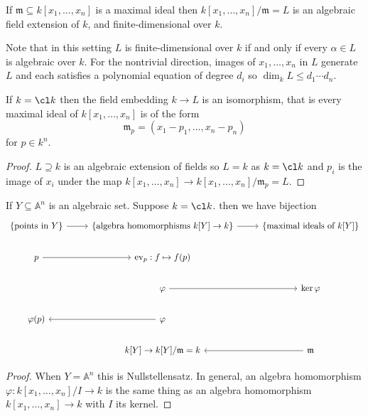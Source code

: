 \documentclass[a4paper]{article}
\renewcommand{\A}{\mathbb{A}}
\DeclareMathOperator{\ev}{ev}
\begin{document}
\begin{theorem}[Nullstellensatz]\leavevmode
  \label{thm:Nullstellensatz}
  If \(\mathfrak m \subseteq k[x_1, \dots, x_n]\) is a maximal ideal then \(k[x_1, \dots, x_n]/\mathfrak m = L\) is an algebraic field extension of \(k\), and finite-dimensional over \(k\).
\end{theorem}

Note that in this setting \(L\) is finite-dimensional over \(k\) if and only if every \(\alpha \in L\) is algebraic over \(k\). For the nontrivial direction, images of \(x_1, \dots, x_n\) in \(L\) generate \(L\) and each satisfies a polynomial equation of degree \(d_i\) so \(\dim_k L \leq d_1 \cdots d_n\).

\begin{corollary}
  If \(k = \cl k\) then the field embedding \(k \to L\) is an isomorphism, that is every maximal ideal of \(k[x_1, \dots, x_n]\) is of the form
  \[
    \mathfrak m_p = (x_1 - p_1, \dots, x_n - p_n)
  \]
  for \(p \in k^n\).
\end{corollary}

\begin{proof}
  \(L \supseteq k\) is an algebraic extension of fields so \(L = k\) as \(k = \cl k\) and \(p_i\) is the image of \(x_i\) under the map \(k[x_1, \dots, x_n] \to k[x_1, \dots, x_n]/\mathfrak m_p = L\).
\end{proof}

\begin{corollary}
  If \(Y \subseteq \A^n\) is an algebraic set. Suppose \(k = \cl k\). then we have bijection
  \[
    \begin{tikzcd}
      \{\text{points in } Y\} \ar[r] & \{\text{algebra homomorphisms } k[Y] \to k\} \ar[r] & \{\text{maximal ideals of } k[Y]\} \\
      p \ar[r] & \ev_p: f \mapsto f(p) \\
      & \varphi \ar[r] & \ker \varphi \\
      \varphi(p) & \varphi \ar[l] \\
      & k[Y] \to k[Y]/\mathfrak m = k & \mathfrak m \ar[l]
    \end{tikzcd}
  \]
\end{corollary}

\begin{proof}
  When \(Y = \A^n\) this is Nullstellensatz. In general, an algebra homomorphism \(\varphi: k[x_1, \dots, x_n]/I \to k\) is the same thing as an algebra homomorphism \(k[x_1, \dots, x_n] \to k\) with \(I\) its kernel.
\end{proof}
\end{document}
